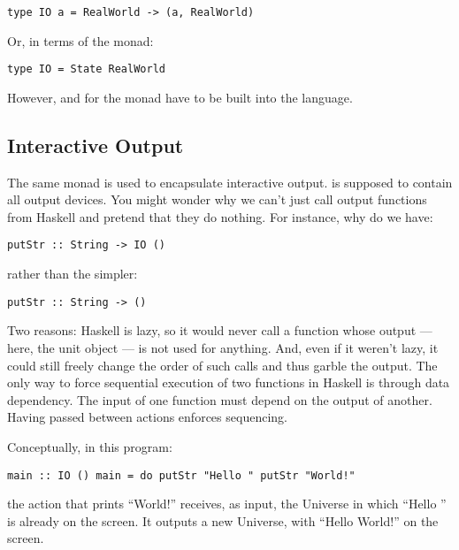 \begin{verbatim}
type IO a = RealWorld -> (a, RealWorld)
\end{verbatim}

Or, in terms of the  monad:

\begin{verbatim}
type IO = State RealWorld
\end{verbatim}

However, \code{>=>} and  for
the  monad have to be built into the language.

\subsection{Interactive Output}\label{interactive-output}

The same  monad is used to encapsulate interactive output.
 is supposed to contain all output devices. You might
wonder why we can't just call output functions from Haskell and pretend
that they do nothing. For instance, why do we have:

\begin{verbatim}
putStr :: String -> IO ()
\end{verbatim}

rather than the simpler:

\begin{verbatim}
putStr :: String -> ()
\end{verbatim}

Two reasons: Haskell is lazy, so it would never call a function whose
output --- here, the unit object --- is not used for anything. And, even
if it weren't lazy, it could still freely change the order of such calls
and thus garble the output. The only way to force sequential execution
of two functions in Haskell is through data dependency. The input of one
function must depend on the output of another. Having 
passed between  actions enforces sequencing.

Conceptually, in this program:

\begin{verbatim}
main :: IO () main = do putStr "Hello " putStr "World!"
\end{verbatim}

the action that prints ``World!'' receives, as input, the Universe in
which ``Hello '' is already on the screen. It outputs a new Universe,
with ``Hello World!'' on the screen.

